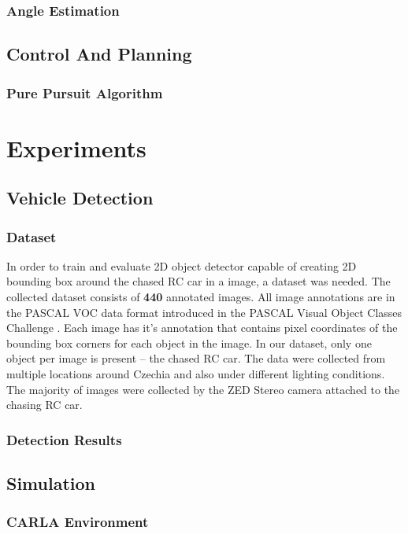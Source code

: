 \subsection{Angle Estimation}

\section{Control And Planning}
\subsection{Pure Pursuit Algorithm}

\chapter{Experiments}

\section{Vehicle Detection}
\subsection{Dataset}
In order to train and evaluate 2D object detector capable of creating 2D bounding box around the chased RC car in a image, a dataset was needed. The collected dataset consists of \textbf{440} annotated images. All image annotations are in the PASCAL VOC data format introduced in the PASCAL Visual Object Classes Challenge \cite{pascal-voc}. Each image has it's annotation that contains pixel coordinates of the bounding box corners for each object in the image. In our dataset, only one object per image is present -- the chased RC car. The data were collected from multiple locations around Czechia and also under different lighting conditions. The majority of images were collected by the ZED Stereo camera attached to the chasing RC car. 


\subsection{Detection Results}

\section{Simulation}
\subsection{CARLA Environment}
